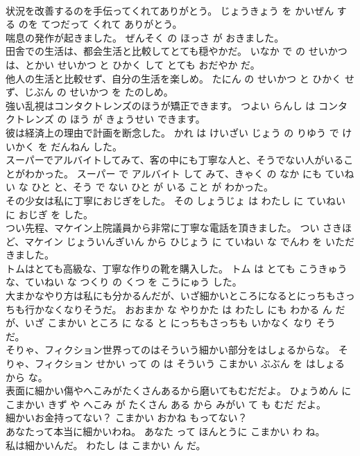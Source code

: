 \documentclass[8pt]{extreport}
\begin{document}
\begin{CJK}{UTF8}{min}
\\	状況を改善するのを手伝ってくれてありがとう。	じょうきょう を かいぜん する のを てつだって くれて ありがとう。	
\\	喘息の発作が起きました。	ぜんそく の ほっさ が おきました。	
\\	田舎での生活は、都会生活と比較してとても穏やかだ。	いなか で の せいかつ は、とかい せいかつ と ひかく して とても おだやか だ。	
\\	他人の生活と比較せず、自分の生活を楽しめ。	たにん の せいかつ と ひかく せず、じぶん の せいかつ を たのしめ。	
\\	強い乱視はコンタクトレンズのほうが矯正できます。	つよい らんし は コンタクトレンズ の ほう が きょうせい できます。	
\\	彼は経済上の理由で計画を断念した。	かれ は けいざい じょう の りゆう で けいかく を だんねん した。	
\\	スーパーでアルバイトしてみて、客の中にも丁寧な人と、そうでない人がいることがわかった。	スーパー で アルバイト して みて、きゃく の なか にも ていねい な ひと と、そう で ない ひと が いる こと が わかった。	
\\	その少女は私に丁寧におじぎをした。	その しょうじょ は わたし に ていねい に おじぎ を した。	
\\	つい先程、マケイン上院議員から非常に丁寧な電話を頂きました。	つい さきほど、マケイン じょういんぎいん から ひじょう に ていねい な でんわ を いただきました。	
\\	トムはとても高級な、丁寧な作りの靴を購入した。	トム は とても こうきゅう な、ていねい な つくり の くつ を こうにゅう した。	
\\	大まかなやり方は私にも分かるんだが、いざ細かいところになるとにっちもさっちも行かなくなりそうだ。	おおまか な やりかた は わたし にも わかる ん だが、いざ こまかい ところ に なる と にっちもさっちも いかなく なり そう だ。	
\\	そりゃ、フィクション世界ってのはそういう細かい部分をはしょるからな。	そりゃ、フィクション せかい って の は そういう こまかい ぶぶん を はしょる から な。	
\\	表面に細かい傷やへこみがたくさんあるから磨いてもむだだよ。	ひょうめん に こまかい きず や へこみ が たくさん ある から みがい て も むだ だよ。	
\\	細かいお金持ってない？	こまかい おかね もってない？	
\\	あなたって本当に細かいわね。	あなた って ほんとうに こまかい わ ね。	
\\	私は細かいんだ。	わたし は こまかい ん だ。	

\end{CJK}
\end{document}
